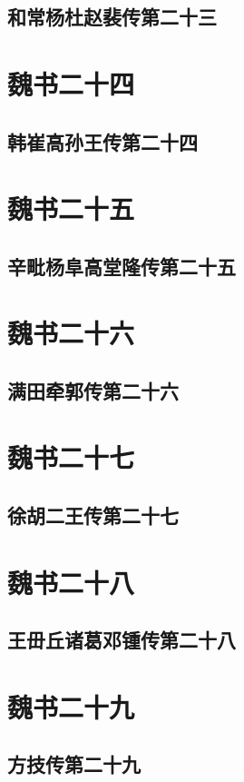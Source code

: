\documentclass[12pt,UTF8]{ctexbook}
\begin{document}
\chapter{和常杨杜赵裴传第二十三}

\part{魏书二十四}
\chapter{韩崔高孙王传第二十四}

\part{魏书二十五}
\chapter{辛毗杨阜高堂隆传第二十五}

\part{魏书二十六}
\chapter{满田牵郭传第二十六}

\part{魏书二十七}
\chapter{徐胡二王传第二十七}

\part{魏书二十八}
\chapter{王毌丘诸葛邓锺传第二十八}

\part{魏书二十九}
\chapter{方技传第二十九}
\end{document}
